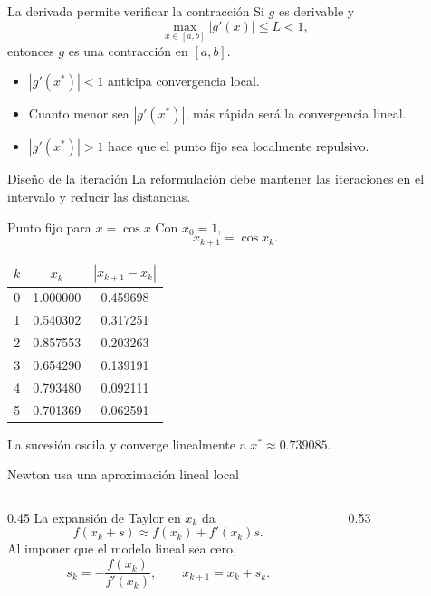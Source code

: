 \documentclass[aspectratio=169,12pt]{beamer}
\begin{document}
\begin{frame}{La derivada permite verificar la contracción}
Si $g$ es derivable y
\[
\max_{x\in[a,b]}|g'(x)|\leq L<1,
\]
entonces $g$ es una contracción en $[a,b]$.
\begin{itemize}
  \item $|g'(x^*)|<1$ anticipa convergencia local.
  \item Cuanto menor sea $|g'(x^*)|$, más rápida será la convergencia lineal.
  \item $|g'(x^*)|>1$ hace que el punto fijo sea localmente repulsivo.
\end{itemize}
\begin{block}{Diseño de la iteración}
La reformulación debe mantener las iteraciones en el intervalo y reducir las distancias.
\end{block}
\end{frame}

\begin{frame}{Punto fijo para $x=\cos x$}
Con $x_0=1$,
\[
x_{k+1}=\cos x_k.
\]
\centering
\begin{tabular}{ccc}
\toprule
$k$ & $x_k$ & $|x_{k+1}-x_k|$ \\
\midrule
0 & 1.000000 & 0.459698 \\
1 & 0.540302 & 0.317251 \\
2 & 0.857553 & 0.203263 \\
3 & 0.654290 & 0.139191 \\
4 & 0.793480 & 0.092111 \\
5 & 0.701369 & 0.062591 \\
\bottomrule
\end{tabular}

La sucesión oscila y converge linealmente a $x^*\approx0.739085$.
\end{frame}

\begin{frame}{Newton usa una aproximación lineal local}
\begin{columns}[T,onlytextwidth]
\begin{column}{0.45\textwidth}
La expansión de Taylor en $x_k$ da
\[
f(x_k+s)\approx f(x_k)+f'(x_k)s.
\]
Al imponer que el modelo lineal sea cero,
\[
s_k=-\frac{f(x_k)}{f'(x_k)},
\qquad
\boxed{x_{k+1}=x_k+s_k}.
\]
\end{column}
\begin{column}{0.53\textwidth}
\centering
\resizebox{\linewidth}{!}{}
\end{column}
\end{columns}
\end{frame}
\end{document}
